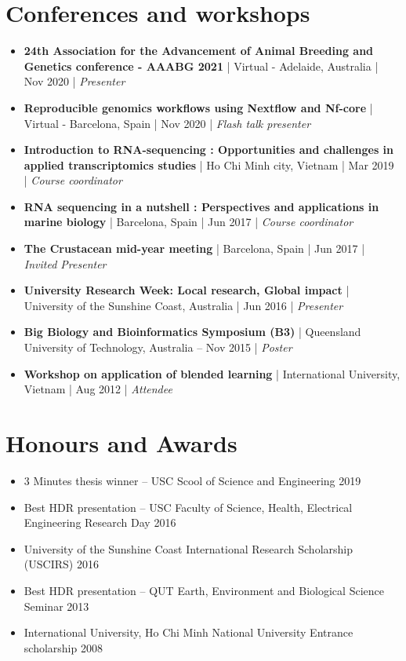 \documentclass[letterpaper,11pt]{article}
\newcommand{\resumeBlack}[1]{\item\small{{#1}}}
\newcommand{\resumeItemListStart}{\begin{itemize}}
\newcommand{\resumeItemListEnd}{\end{itemize}}
\begin{document}
\section{Conferences and workshops}
  \resumeItemListStart
    \resumeBlack{\textbf{24th Association for the Advancement of Animal Breeding and Genetics conference - AAABG 2021}  | Virtual - Adelaide, Australia | Nov 2020 | \textit{Presenter}}
    \resumeBlack{\textbf{Reproducible genomics workflows using Nextflow and Nf-core}  | Virtual - Barcelona, Spain | Nov 2020 | \textit{Flash talk presenter}}
    \resumeBlack{\textbf{Introduction to RNA-sequencing : Opportunities and challenges in applied transcriptomics studies}  |  Ho Chi Minh city, Vietnam | Mar 2019 | \textit{Course coordinator}}
    \resumeBlack{\textbf{RNA sequencing in a nutshell : Perspectives and applications in marine biology}  |  Barcelona, Spain | Jun 2017 | \textit{Course coordinator}}
    \resumeBlack{\textbf{The Crustacean mid-year meeting} | Barcelona, Spain | Jun 2017 | \textit{Invited Presenter}}
    \resumeBlack{\textbf{University Research Week: Local research, Global impact} | University of the Sunshine Coast, Australia | Jun 2016 | \textit{Presenter}}
    \resumeBlack{\textbf{Big Biology and Bioinformatics Symposium (B3)} | Queensland University of Technology, Australia – Nov 2015 | \textit{Poster}}
    \resumeBlack{\textbf{Workshop on application of blended learning} | International University, Vietnam | Aug 2012 | \textit{Attendee}}
  \resumeItemListEnd

\section{Honours and Awards}
\resumeItemListStart
	\resumeBlack{3 Minutes thesis winner – USC Scool of Science and Engineering 2019}
	\resumeBlack{Best HDR presentation – USC Faculty of Science, Health, Electrical Engineering Research Day 2016}
  \resumeBlack{University of the Sunshine Coast International Research Scholarship (USCIRS) 2016}
  \resumeBlack{Best HDR presentation –  QUT Earth, Environment and Biological Science Seminar 2013}
  \resumeBlack{International University, Ho Chi Minh National University Entrance scholarship 2008}
\resumeItemListEnd  

\end{document}

